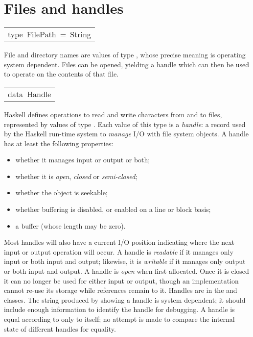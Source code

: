 \section{Files and handles
}
\begin{haddockdesc}
\item[\begin{tabular}{@{}l}
type\ FilePath\ =\ String
\end{tabular}]\haddockbegindoc
File and directory names are values of type , whose precise
 meaning is operating system dependent. Files can be opened, yielding a
 handle which can then be used to operate on the contents of that file.
\par

\end{haddockdesc}
\begin{haddockdesc}
\item[\begin{tabular}{@{}l}
data\ Handle
\end{tabular}]\haddockbegindoc
Haskell defines operations to read and write characters from and to files,
 represented by values of type .  Each value of this type is a
 \emph{handle}: a record used by the Haskell run-time system to \emph{manage} I/O
 with file system objects.  A handle has at least the following properties:
\par
\begin{itemize}
\item
 whether it manages input or output or both;
\par

\item
 whether it is \emph{open}, \emph{closed} or \emph{semi-closed};
\par

\item
 whether the object is seekable;
\par

\item
 whether buffering is disabled, or enabled on a line or block basis;
\par

\item
 a buffer (whose length may be zero).
\par

\end{itemize}
Most handles will also have a current I/O position indicating where the next
 input or output operation will occur.  A handle is \emph{readable} if it
 manages only input or both input and output; likewise, it is \emph{writable} if
 it manages only output or both input and output.  A handle is \emph{open} when
 first allocated.
 Once it is closed it can no longer be used for either input or output,
 though an implementation cannot re-use its storage while references
 remain to it.  Handles are in the  and  classes.  The string
 produced by showing a handle is system dependent; it should include
 enough information to identify the handle for debugging.  A handle is
 equal according to \haddockid{==} only to itself; no attempt
 is made to compare the internal state of different handles for equality.
\par


\end{haddockdesc}
